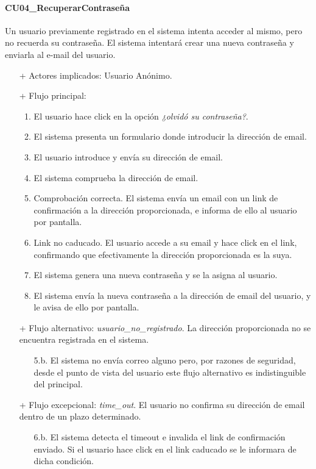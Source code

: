 \documentclass[a4paper]{article}
\begin{document}
            \paragraph{CU04\_RecuperarContraseña}
                Un usuario previamente registrado en el sistema intenta acceder al mismo, pero no recuerda su contraseña. El sistema intentará crear una nueva contraseña y enviarla al e-mail del usuario.
                \begin{itemize}
                    \item[+] Actores implicados: Usuario Anónimo.
                    \item[+] Flujo principal:
                    \begin{enumerate}
                        \item El usuario hace click en la opción \emph{¿olvidó su contraseña?}.
                        \item El sistema presenta un formulario donde introducir la dirección de email.
                        \item El usuario introduce y envía su dirección de email.
                        \item El sistema comprueba la dirección de email.
                        \item Comprobación correcta. El sistema envía un email con un link de confirmación a la dirección proporcionada, e informa de ello al usuario por pantalla.
                        \item Link no caducado. El usuario accede a su email y hace click en el link, confirmando que efectivamente la dirección proporcionada es la suya.
                        \item El sistema genera una nueva contraseña y se la asigna al usuario.
                        \item El sistema envía la nueva contraseña a la dirección de email del usuario, y le avisa de ello por pantalla.
                    \end{enumerate}
                    \item[+] Flujo alternativo: \emph{usuario\_no\_registrado}. La dirección proporcionada no se encuentra registrada en el sistema.
                    \begin{itemize}
                        \item[5.b.] El sistema no envía correo alguno pero, por razones de seguridad, desde el punto de vista del usuario este flujo alternativo es indistinguible del principal.
                    \end{itemize}
                    \item[+] Flujo excepcional: \emph{time\_out}. El usuario no confirma su dirección de email dentro de un plazo determinado.
                    \begin{itemize}
                        \item[6.b.] El sistema detecta el timeout e invalida el link de confirmación enviado. Si el usuario hace click en el link caducado se le informara de dicha condición.
                    \end{itemize}
                \end{itemize}
\end{document}
